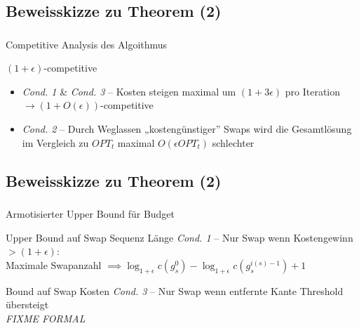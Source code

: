 \subsection{Beweisskizze zu Theorem (2)}
\begin{frame}
    \frametitle{\insertsubsection}
    Competitive Analysis des Algoithmus\\
    \vspace{1em}
    \begin{block}{$(1+\epsilon)$-competitive}
    \vspace{1em}
        \begin{itemize}
            \itemsep\setlength{1em}
            \item \emph{Cond. 1} \& \emph{Cond. 3} -- Kosten steigen maximal um $(1+3\epsilon)$ pro Iteration $\rightarrow (1+O(\epsilon))$-competitive
            \item \emph{Cond. 2} -- Durch Weglassen „kostengünstiger” Swaps wird die Gesamtlösung im Vergleich zu $OPT_t$ maximal $O(\epsilon OPT_t)$ schlechter
        \end{itemize}
    \vspace{1em}
    \end{block}
\end{frame}

\subsection{Beweisskizze zu Theorem (2)}
\begin{frame}
    \frametitle{\insertsubsection}
    Armotisierter Upper Bound für Budget
    \vspace{1em}
    \begin{block}{Upper Bound auf Swap Sequenz Länge}
        \vspace{1em}
        \emph{Cond. 1} -- Nur Swap wenn Kostengewinn $> (1+\epsilon)$:\\Maximale Swapanzahl $\implies \log_{1+\epsilon}c(g_s^0) - \log_{1+\epsilon}c(g_s^{i(s)-1}) + 1$
        \vspace{1em}
    \end{block}
    \vspace{1em}
    \begin{block}{Bound auf Swap Kosten}
        \vspace{1em}
        \emph{Cond. 3} -- Nur Swap wenn entfernte Kante Threshold übersteigt \\
        \emph{FIXME FORMAL}
        \vspace{1em}
    \end{block}
\end{frame}

